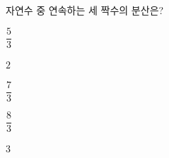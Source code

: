 자연수 중 연속하는 세 짝수의 분산은?
\begin{choices32}{\rule[-3ex]{0pt}{8ex}$\dfrac{5}{3}$}{\rule[-3ex]{0pt}{8ex}$2$}{\rule[-3ex]{0pt}{8ex}$\dfrac{7}{3}$}{\rule[-3ex]{0pt}{8ex}$\dfrac{8}{3}$}{\rule[-3ex]{0pt}{8ex}$3$}\end{choices32}
